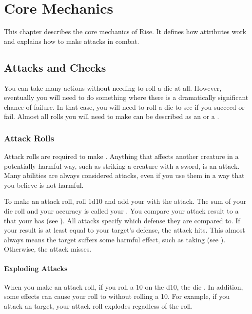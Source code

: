 \chapter{Core Mechanics}

This chapter describes the core mechanics of Rise.
It defines how attributes work and explains how to make attacks in combat.

\section{Attacks and Checks}\label{Attacks and Checks}
    You can take many actions without needing to roll a die at all.
    However, eventually you will need to do something where there is a dramatically significant chance of failure.
    In that case, you will need to roll a die to see if you succeed or fail.
    Almost all rolls you will need to make can be described as an  or a .

    \subsection{Attack Rolls}
        Attack rolls are required to make .
        Anything that affects another creature in a potentially harmful way, such as striking a creature with a sword, is an attack.
        Many abilities are always considered attacks, even if you use them in a way that you believe is not harmful.

        To make an attack roll, roll 1d10 and add your  with the attack.
        The sum of your die roll and your accuracy is called your .
        You compare your attack result to a  that your  has (see ).
        All attacks specify which defense they are compared to.
        If your result is at least equal to your target's defense, the attack hits.
        This almost always means the target suffers some harmful effect, such as taking  (see ).
        Otherwise, the attack misses.

        \subsubsection{Exploding Attacks}\label{Exploding Attacks}
            When you make an attack roll, if you roll a 10 on the d10, the die .
            In addition, some effects can cause your roll to  without rolling a 10.
            For example, if you attack an  target, your attack roll explodes regadless of the roll.


